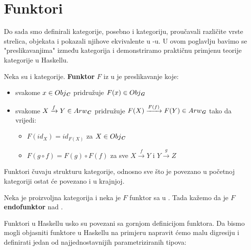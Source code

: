   \section{Funktori}
  Do sada smo definirali kategorije, posebno i  kategoriju,
  proučavali različite vrste strelica, objekata i pokazali njihove ekvivalente
  u -u. U ovom poglavlju bavimo se "preslikavanjima" između
  kategorija i demonstriramo praktičnu primjenu teorije kategorije u Haskellu.
  \begin{definition}
    Neka su  i  kategorije. \textbf{Funktor} $F$ iz
     u  je preslikavanje koje:
    \begin{itemize}
      \item svakome $x \in Obj_{\textbf{\emph{C}}}$ pridružuje $F(x) \in
        Obj_{\textbf{\emph{G}}}$
      \item svakome $X \xrightarrow{f} Y \in Arw_{\textbf{\emph{C}}}$ pridružuje
        $F(X) \xrightarrow{F(f)} F(Y) \in Arw_{\textbf{\emph{G}}}$ tako da vrijedi:
        \begin{itemize}
          \item $F(id_X) = id_{F(X)}$ za $X \in Obj_{\textbf{\emph{C}}}$
          \item $F(g \circ f) = F(g) \circ F(f)$ za sve $X \xrightarrow{f} Y$ i
            $Y \xrightarrow{g} Z$
        \end{itemize}
    \end{itemize}
  \end{definition}
  Funktori čuvaju strukturu kategorije, odnosno sve što je povezano u početnoj
  kategoriji ostat će povezano i u krajnjoj.
  \begin{definition}
    Neka je  proizvoljna kategorija i neka je $F$ funktor sa
     u . Tada kažemo da je $F$ \textbf{endofunktor} nad
    .
  \end{definition}
  Funktori u Haskellu usko su povezani sa gornjom definicijom funktora. 
  Da bismo mogli objasniti funktore u Haskellu na primjeru napravit ćemo malu digresiju i definirati
  jedan od najjednostavnijih parametriziranih tipova: 
